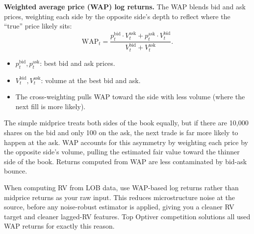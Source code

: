 \textbf{Weighted average price (WAP) log returns.}
The WAP blends bid and ask prices, weighting each side by the opposite side's depth to reflect where the ``true'' price likely sits:
\begin{equation}\label{eq:wap}
\text{WAP}_t = \frac{p_t^{\text{bid}} \cdot V_t^{\text{ask}} + p_t^{\text{ask}} \cdot V_t^{\text{bid}}}{V_t^{\text{bid}} + V_t^{\text{ask}}}.
\end{equation}
\begin{itemize}[nosep]
  \item $p_t^{\text{bid}}, p_t^{\text{ask}}$: best bid and ask prices.
  \item $V_t^{\text{bid}}, V_t^{\text{ask}}$: volume at the best bid and ask.
  \item The cross-weighting pulls WAP toward the side with less volume (where the next fill is more likely).
\end{itemize}

\begin{intuition}
The simple midprice treats both sides of the book equally, but if there are 10,000 shares on the bid and only 100 on the ask, the next trade is far more likely to happen at the ask. WAP accounts for this asymmetry by weighting each price by the opposite side's volume, pulling the estimated fair value toward the thinner side of the book. Returns computed from WAP are less contaminated by bid-ask bounce.
\end{intuition}

\begin{projectconnection}
When computing RV from LOB data, use WAP-based log returns rather than midprice returns as your raw input. This reduces microstructure noise at the source, before any noise-robust estimator is applied, giving you a cleaner RV target and cleaner lagged-RV features. Top Optiver competition solutions all used WAP returns for exactly this reason.
\end{projectconnection}

